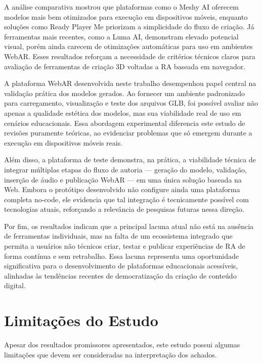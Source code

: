 \documentclass[conference]{IEEEtran}
\begin{document}
A análise comparativa mostrou que plataformas como o Meshy AI oferecem modelos mais bem otimizados para execução em dispositivos móveis, enquanto soluções como Ready Player Me priorizam a simplicidade do fluxo de criação. Já ferramentas mais recentes, como a Luma AI, demonstram elevado potencial visual, porém ainda carecem de otimizações automáticas para uso em ambientes WebAR. Esses resultados reforçam a necessidade de critérios técnicos claros para avaliação de ferramentas de criação 3D voltadas a RA baseada em navegador.

A plataforma WebAR desenvolvida neste trabalho desempenhou papel central na validação prática dos modelos gerados. Ao fornecer um ambiente padronizado para carregamento, visualização e teste dos arquivos GLB, foi possível avaliar não apenas a qualidade estética dos modelos, mas sua viabilidade real de uso em cenários educacionais. Essa abordagem experimental diferencia este estudo de revisões puramente teóricas, ao evidenciar problemas que só emergem durante a execução em dispositivos móveis reais.

Além disso, a plataforma de teste demonstra, na prática, a viabilidade técnica de integrar múltiplas etapas do fluxo de autoria — geração do modelo, validação, inserção de áudio e publicação WebAR — em uma única solução baseada na Web. Embora o protótipo desenvolvido não configure ainda uma plataforma completa no-code, ele evidencia que tal integração é tecnicamente possível com tecnologias atuais, reforçando a relevância de pesquisas futuras nessa direção.

Por fim, os resultados indicam que a principal lacuna atual não está na ausência de ferramentas individuais, mas na falta de um ecossistema integrado que permita a usuários não técnicos criar, testar e publicar experiências de RA de forma contínua e sem retrabalho. Essa lacuna representa uma oportunidade significativa para o desenvolvimento de plataformas educacionais acessíveis, alinhadas às tendências recentes de democratização da criação de conteúdo digital.




\section{Limitações do Estudo}

Apesar dos resultados promissores apresentados, este estudo possui algumas limitações que devem ser consideradas na interpretação dos achados.
\end{document}
